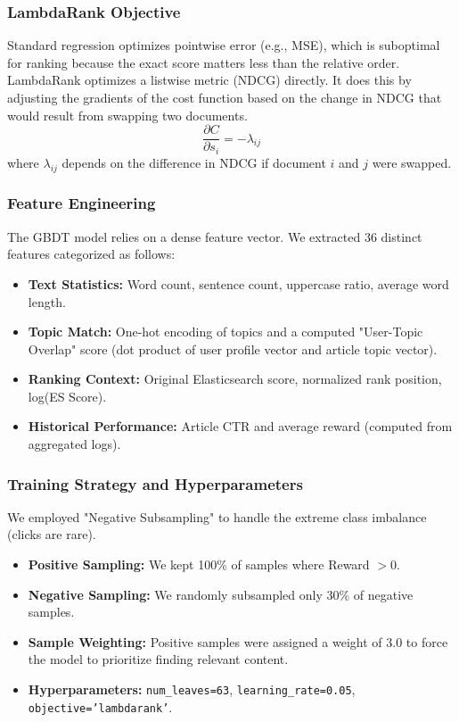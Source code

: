 \documentclass[11pt,a4paper]{article}
\begin{document}
\subsubsection{LambdaRank Objective}
Standard regression optimizes pointwise error (e.g., MSE), which is suboptimal for ranking because the exact score matters less than the relative order. LambdaRank optimizes a listwise metric (NDCG) directly. It does this by adjusting the gradients of the cost function based on the change in NDCG that would result from swapping two documents.
$$ \frac{\partial C}{\partial s_i} = - \lambda_{ij} $$
where $\lambda_{ij}$ depends on the difference in NDCG if document $i$ and $j$ were swapped.

\subsubsection{Feature Engineering}
The GBDT model relies on a dense feature vector. We extracted 36 distinct features categorized as follows:
\begin{itemize}
    \item \textbf{Text Statistics:} Word count, sentence count, uppercase ratio, average word length.
    \item \textbf{Topic Match:} One-hot encoding of topics and a computed "User-Topic Overlap" score (dot product of user profile vector and article topic vector).
    \item \textbf{Ranking Context:} Original Elasticsearch score, normalized rank position, log(ES Score).
    \item \textbf{Historical Performance:} Article CTR and average reward (computed from aggregated logs).
\end{itemize}

\subsubsection{Training Strategy and Hyperparameters}
We employed "Negative Subsampling" to handle the extreme class imbalance (clicks are rare).
\begin{itemize}
    \item \textbf{Positive Sampling:} We kept 100\% of samples where Reward $> 0$.
    \item \textbf{Negative Sampling:} We randomly subsampled only 30\% of negative samples.
    \item \textbf{Sample Weighting:} Positive samples were assigned a weight of 3.0 to force the model to prioritize finding relevant content.
    \item \textbf{Hyperparameters:} \texttt{num\_leaves=63}, \texttt{learning\_rate=0.05}, \texttt{objective='lambdarank'}.
\end{itemize}
\end{document}

